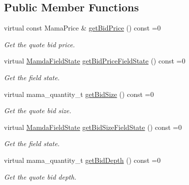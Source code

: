 \subsection*{Public Member Functions}
\begin{CompactItemize}
\item 
virtual const Mama\-Price \& \hyperlink{classWombat_1_1MamdaQuotePossiblyDuplicate_789b485695d2da449c4e7eb5b38c9a90}{get\-Bid\-Price} () const =0
\begin{CompactList}\small\item\em Get the quote bid price. \item\end{CompactList}\item 
virtual \hyperlink{namespaceWombat_93aac974f2ab713554fd12a1fa3b7d2a}{Mamda\-Field\-State} \hyperlink{classWombat_1_1MamdaQuotePossiblyDuplicate_a6a72244b3f12d0c8d1a0c14a7305764}{get\-Bid\-Price\-Field\-State} () const =0
\begin{CompactList}\small\item\em Get the field state. \item\end{CompactList}\item 
virtual mama\_\-quantity\_\-t \hyperlink{classWombat_1_1MamdaQuotePossiblyDuplicate_40310d566fe0070d4bffa77365a98108}{get\-Bid\-Size} () const =0
\begin{CompactList}\small\item\em Get the quote bid size. \item\end{CompactList}\item 
virtual \hyperlink{namespaceWombat_93aac974f2ab713554fd12a1fa3b7d2a}{Mamda\-Field\-State} \hyperlink{classWombat_1_1MamdaQuotePossiblyDuplicate_71ec701a3d28eda9f4fca37e44704e99}{get\-Bid\-Size\-Field\-State} () const =0
\begin{CompactList}\small\item\em Get the field state. \item\end{CompactList}\item 
virtual mama\_\-quantity\_\-t \hyperlink{classWombat_1_1MamdaQuotePossiblyDuplicate_db64412a64c43f702ac5ad6537570775}{get\-Bid\-Depth} () const =0
\begin{CompactList}\small\item\em Get the quote bid depth. \item\end{CompactList}\item 

\end{CompactItemize}
